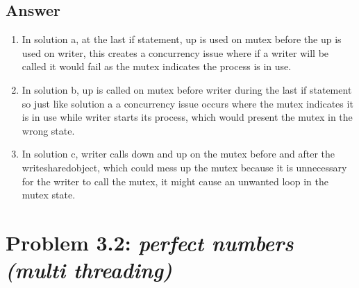 \documentclass[
	12pt, %
]{fphw}
\begin{document}
\subsection*{Answer}
\begin{enumerate}
	\item In solution a, at the last if statement, up is used on mutex before the up is used on writer, this creates a concurrency issue where if a writer will be called it would fail as the mutex indicates the process is in use.
	\item In solution b, up is called on mutex before writer during the last if statement so just like solution a a concurrency issue occurs where the mutex indicates it is in use while writer starts its process, which would present the mutex in the wrong state.
	\item In solution c, writer calls down and up on the mutex before and after the writesharedobject, which could mess up the mutex because it is unnecessary for the writer to call the mutex, it might cause an unwanted loop in the mutex state.
\end{enumerate}



\section*{Problem 3.2: \emph{perfect numbers (multi threading)}}
\end{document}
